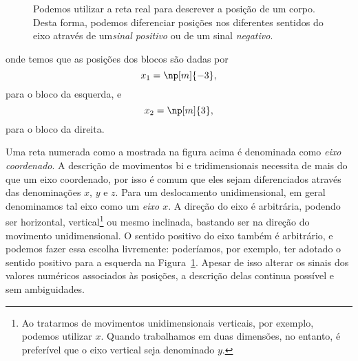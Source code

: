 \begin{figure}
\centering
{}
\caption{Podemos utilizar a reta real para descrever a posição de um corpo. Desta forma, podemos diferenciar posições nos diferentes sentidos do eixo através de um\emph{sinal positivo} ou de um sinal \emph{negativo}.\label{Fig:dois_blocos}}
\end{figure}

\noindent{}onde temos que as posições dos blocos são dadas por
\begin{equation}
    x_1 = \np[m]{-3},
\end{equation}
%
para o bloco da esquerda, e
\begin{equation}
    x_2 = \np[m]{3},
\end{equation}
%
para o bloco da direita.

Uma reta numerada como a mostrada na figura acima é denominada como \emph{eixo coordenado}. A descrição de movimentos bi e tridimensionais necessita de mais do que um eixo coordenado, por isso é comum que eles sejam diferenciados através das denominações $x$, $y$ e $z$. Para um deslocamento unidimensional, em geral denominamos tal eixo como um \emph{eixo $x$}. A direção do eixo é arbitrária, podendo ser horizontal, vertical\footnote{Ao tratarmos de movimentos unidimensionais verticais, por exemplo, podemos utilizar $x$. Quando trabalhamos em duas dimensões, no entanto, é preferível que o eixo vertical seja denominado $y$.} ou mesmo inclinada, bastando ser na direção do movimento unidimensional. O sentido positivo do eixo também é arbitrário, e podemos fazer essa escolha livremente: poderíamos, por exemplo, ter adotado o sentido positivo para a esquerda na Figura~\ref{Fig:dois_blocos}. Apesar de isso alterar os sinais dos valores numéricos associados às posições, a descrição delas continua possível e sem ambiguidades.

